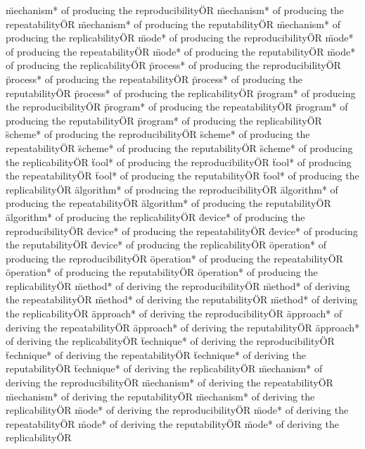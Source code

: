\documentclass[
10pt, %
a4paper, %
oneside, %
headinclude,footinclude, %
BCOR5mm, %
]{scrartcl}
\begin{document}
\"mechanism* of producing the reproducibility\" OR \"mechanism* of producing the repeatability\" OR \"mechanism* of producing the reputability\" OR \"mechanism* of producing the replicability\" OR 
\"mode* of producing the reproducibility\" OR \"mode* of producing the repeatability\" OR \"mode* of producing the reputability\" OR \"mode* of producing the replicability\" OR 
\"process* of producing the reproducibility\" OR \"process* of producing the repeatability\" OR \"process* of producing the reputability\" OR \"process* of producing the replicability\" OR 
\"program* of producing the reproducibility\" OR \"program* of producing the repeatability\" OR \"program* of producing the reputability\" OR \"program* of producing the replicability\" OR 
\"scheme* of producing the reproducibility\" OR \"scheme* of producing the repeatability\" OR \"scheme* of producing the reputability\" OR \"scheme* of producing the replicability\" OR 
\"tool* of producing the reproducibility\" OR \"tool* of producing the repeatability\" OR \"tool* of producing the reputability\" OR \"tool* of producing the replicability\" OR 
\"algorithm* of producing the reproducibility\" OR \"algorithm* of producing the repeatability\" OR \"algorithm* of producing the reputability\" OR \"algorithm* of producing the replicability\" OR 
\"device* of producing the reproducibility\" OR \"device* of producing the repeatability\" OR \"device* of producing the reputability\" OR \"device* of producing the replicability\" OR 
\"operation* of producing the reproducibility\" OR \"operation* of producing the repeatability\" OR \"operation* of producing the reputability\" OR \"operation* of producing the replicability\" OR 
\"method* of deriving the reproducibility\" OR \"method* of deriving the repeatability\" OR \"method* of deriving the reputability\" OR \"method* of deriving the replicability\" OR 
\"approach* of deriving the reproducibility\" OR \"approach* of deriving the repeatability\" OR \"approach* of deriving the reputability\" OR \"approach* of deriving the replicability\" OR 
\"technique* of deriving the reproducibility\" OR \"technique* of deriving the repeatability\" OR \"technique* of deriving the reputability\" OR \"technique* of deriving the replicability\" OR 
\"mechanism* of deriving the reproducibility\" OR \"mechanism* of deriving the repeatability\" OR \"mechanism* of deriving the reputability\" OR \"mechanism* of deriving the replicability\" OR 
\"mode* of deriving the reproducibility\" OR \"mode* of deriving the repeatability\" OR \"mode* of deriving the reputability\" OR \"mode* of deriving the replicability\" OR 
\end{document}
